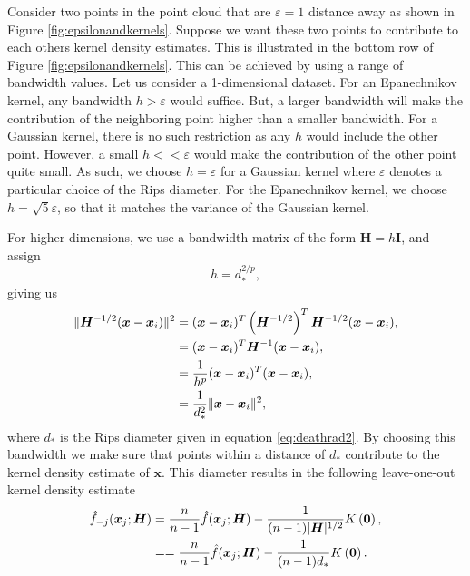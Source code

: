 \documentclass[11pt,a4paper,]{article}
\theoremstyle{definition}
\theoremstyle{definition}
\theoremstyle{definition}
\theoremstyle{remark}
\begin{document}
Consider two points in the point cloud that are \(\varepsilon = 1\) distance away as shown in Figure \ref{fig:epsilonandkernels}. Suppose we want these two points to contribute to each others kernel density estimates. This is illustrated in the bottom row of Figure \ref{fig:epsilonandkernels}. This can be achieved by using a range of bandwidth values. Let us consider a 1-dimensional dataset. For an Epanechnikov kernel, any bandwidth \(h>\varepsilon\) would suffice. But, a larger bandwidth will make the contribution of the neighboring point higher than a smaller bandwidth. For a Gaussian kernel, there is no such restriction as any \(h\) would include the other point. However, a small \(h < < \varepsilon\) would make the contribution of the other point quite small. As such, we choose \(h=\varepsilon\) for a Gaussian kernel where \(\varepsilon\) denotes a particular choice of the Rips diameter. For the Epanechnikov kernel, we choose \(h = \sqrt{5} \varepsilon\), so that it matches the variance of the Gaussian kernel.

For higher dimensions, we use a bandwidth matrix of the form \(\bm{H} = h\bm{I}\), and assign
\begin{equation}\label{eq:bandwidth}
    h = d_*^{2/p}  ,
\end{equation}
giving us
\begin{align}\label{eq:kde11}
    \| \bm{H}^{-1/2}(\bm{x} - \bm{x}_i) \|^2
      & = (\bm{x} - \bm{x}_i)^T \left(\bm{H}^{-1/2}\right)^T \bm{H}^{-1/2} (\bm{x} - \bm{x}_i)  , \notag \\
      & = (\bm{x} - \bm{x}_i)^T \bm{H}^{-1} (\bm{x} - \bm{x}_i)  , \notag                                \\
      & = \frac{1}{h^p}(\bm{x} - \bm{x}_i)^T (\bm{x} - \bm{x}_i) , \notag                                \\
      & = \frac{1}{d_*^2}\|\bm{x} - \bm{x}_i \|^2  ,
\end{align}
where \(d_*\) is the Rips diameter given in equation \eqref{eq:deathrad2}. By choosing this bandwidth we make sure that points within a distance of \(d_*\) contribute to the kernel density estimate of \(\bm{x}\). This diameter results in the following leave-one-out kernel density estimate
\begin{align}\label{eq:kde12}
    \hat{f}_{-j}(\bm{x}_j;\bm{H})
      & = \frac{n}{n-1} \hat{f}(\bm{x}_j;\bm{H}) - \frac{1}{(n-1)|\bm{H}|^{1/2}} K\left(\bm{0}\right)  , \notag \\
      & = = \frac{n}{n-1} \hat{f}(\bm{x}_j;\bm{H}) - \frac{1}{(n-1)d_*} K\left(\bm{0}\right)  .
\end{align}
\end{document}
